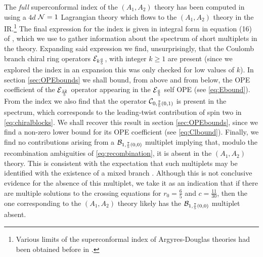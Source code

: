 The \emph{full} superconformal index of the $(A_1,A_2)$  theory has been computed in \cite{Maruyoshi:2016tqk} using a $4d$ ${\mathcal{N}}=1$ Lagrangian theory which flows to the $(A_1,A_2)$ theory in the IR.\footnote{Various limits of the superconformal index of Argyres-Douglas theories had been  obtained before in \cite{Buican:2015ina,Buican:2015tda,Cordova:2015nma,Song:2015wta}.}
The final expression for the index is given in integral form in equation (16) of \cite{Maruyoshi:2016tqk}, which we use to gather information about the spectrum of short multiplets in the theory. Expanding said expression we find, unsurprisingly, that the Coulomb branch chiral ring operators ${\mathcal{E}}_{k \frac65}$, with integer $k\geqslant1$ are present (since we explored the index in an expansion this was only checked for low values of $k$). In section \ref{sec:OPEbounds} we shall bound, from above and from below, the OPE coefficient of the ${\mathcal{E}}_{\frac{12}5}$ operator appearing in the ${\mathcal{E}}_{\frac65}$ self OPE (see \eqref{eq:Ebound}).
From the index we also find that the operator ${\mathcal{C}}_{0,\frac75(0,1)}$  is present in the spectrum, which corresponds to the leading-twist contribution of spin two in \eqref{eq:chiralblocks}. We shall recover this result in section \ref{sec:OPEbounds}, since we find a non-zero lower bound for its OPE coefficient (see \eqref{eq:Clbound}).
Finally, we find no contributions arising from a  ${\mathcal{B}}_{1, \frac75(0,0)}$ multiplet implying that, modulo 
the recombination ambiguities of \eqref{eq:recombination}, it is absent in the $(A_1,A_2)$ theory. This is consistent with the expectation that such multiplets may be identified with the existence of a mixed branch \cite{Argyres:2015ffa}. Although this is not conclusive evidence for the absence of this multiplet, we take it as an indication that if there are multiple solutions to the crossing equations for $r_0=\frac65$ and $c=\tfrac{11}{30}$, then the one corresponding to the $(A_1,A_2)$ theory likely has the ${\mathcal{B}}_{1, \frac75(0,0)}$ multiplet absent.
